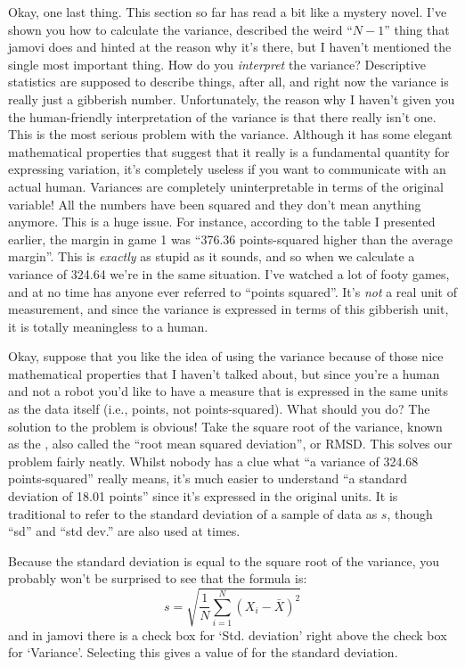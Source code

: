 Okay, one last thing. This section so far has read a bit like a mystery novel. I've shown you how to calculate the variance, described the weird ``$N-1$'' thing that jamovi does and hinted at the reason why it's there, but I haven't mentioned the single most important thing. How do you {\it interpret} the variance? Descriptive statistics are supposed to describe things, after all, and right now the variance is really just a gibberish number. Unfortunately, the reason why I haven't given you the human-friendly interpretation of the variance is that there really isn't one. This is the most serious problem with the variance. Although it has some elegant mathematical properties that suggest that it really is a fundamental quantity for expressing variation, it's completely useless if you want to communicate with an actual human. Variances are completely uninterpretable in terms of the original variable! All the numbers have been squared and they don't mean anything anymore. This is a huge issue. For instance, according to the table I presented earlier, the margin in game 1 was ``376.36 points-squared higher than the average margin''. This is {\it exactly} as stupid as it sounds, and so when we calculate a variance of 324.64 we're in the same situation. I've watched a lot of footy games, and at no time has anyone ever  referred to ``points squared''. It's {\it not} a real unit of measurement, and since the variance is expressed in terms of this gibberish unit, it is totally meaningless to a human.


Okay, suppose that you like the idea of using the variance because of those nice mathematical properties that I haven't talked about, but since you're a human and not a robot you'd like to have a measure that is expressed in the same units as the data itself (i.e., points, not points-squared). What should you do? The solution to the problem is obvious! Take the square root of the variance, known as the , also called the ``root mean squared deviation'', or RMSD. This solves our problem fairly neatly. Whilst nobody has a clue what ``a variance of 324.68 points-squared'' really means, it's much easier to understand ``a standard deviation of 18.01 points'' since it's expressed in the original units. It is traditional to refer to the standard deviation of a sample of data as $s$, though 	``sd'' and ``std dev.'' are also used at times. 

\vspace{0.5cm}
\begin{mdframed}[style=MyFrame,nobreak=true]
Because the standard deviation is equal to the square root of the variance, you probably won't be surprised to see that the formula is:
$$
s = \sqrt{ \frac{1}{N} \sum_{i=1}^N \left( X_i - \bar{X} \right)^2 }
$$
and in jamovi there is a check box for `Std. deviation' right above the check box for `Variance'. Selecting this gives a value of  for the standard deviation. 
\end{mdframed}

